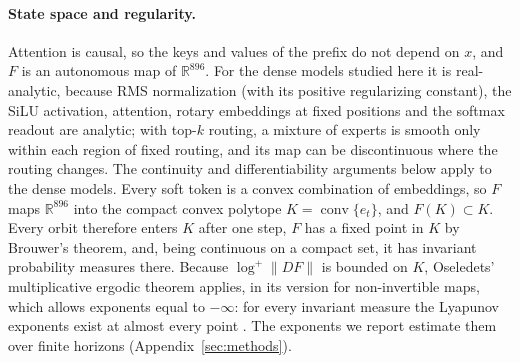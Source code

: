 \documentclass[11pt,letterpaper]{article}
\begin{document}
\paragraph{State space and regularity.} Attention is causal, so the keys and values of the prefix do not depend on
$x$, and $F$ is an autonomous map of $\mathbb{R}^{896}$. For the dense models studied here it is real-analytic, because
RMS normalization (with its positive regularizing constant), the SiLU activation, attention, rotary embeddings at fixed
positions and the softmax readout are analytic; with top-$k$ routing, a mixture of experts is smooth only within each region of fixed routing, and its map can be
discontinuous where the routing changes. The continuity and differentiability arguments below apply to the dense
models. Every soft token is a convex combination of embeddings, so $F$ maps $\mathbb{R}^{896}$ into the
compact convex polytope $K=\operatorname{conv}\{e_t\}$, and $F(K)\subset K$. Every orbit therefore enters $K$ after one
step, $F$ has a fixed point in $K$ by Brouwer's theorem, and, being continuous on a compact set, it has invariant
probability measures there. Because $\log^+\lVert DF\rVert$ is bounded on $K$, Oseledets' multiplicative ergodic
theorem applies, in its version for non-invertible maps, which allows exponents equal to $-\infty$: for every
invariant measure the Lyapunov exponents exist at almost every point
\cite{oseledets1968multiplicative,eckmann1985ergodic}. The exponents we report estimate them over finite horizons
(Appendix~\ref{sec:methods}).
\end{document}
